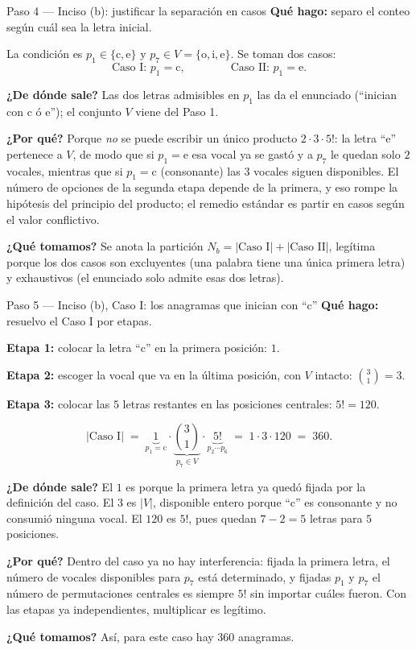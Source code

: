 \documentclass[11pt]{article}
\begin{document}
\begin{paso}{Paso 4 --- Inciso (b): justificar la separación en casos}
\textbf{Qué hago:} separo el conteo según cuál sea la letra inicial.

La condición es $p_1\in\{\text{c},\text{e}\}$ y $p_7\in V=\{\text{o},\text{i},\text{e}\}$. Se toman dos casos:
\[
  \text{Caso I: } p_1=\text{c},\qquad\qquad \text{Caso II: } p_1=\text{e} .
\]

\textbf{¿De dónde sale?} Las dos letras admisibles en $p_1$ las da el enunciado (``inician con c ó e''); el conjunto $V$ viene del Paso 1.

\textbf{¿Por qué?} Porque \emph{no} se puede escribir un único producto $2\cdot 3\cdot 5!$: la letra ``e'' pertenece a $V$, de modo que si $p_1=\text{e}$ esa vocal ya se gastó y a $p_7$ le quedan solo $2$ vocales, mientras que si $p_1=\text{c}$ (consonante) las $3$ vocales siguen disponibles. El número de opciones de la segunda etapa depende de la primera, y eso rompe la hipótesis del principio del producto; el remedio estándar es partir en casos según el valor conflictivo.

\textbf{¿Qué tomamos?} Se anota la partición $N_b=|\text{Caso I}|+|\text{Caso II}|$, legítima porque los dos casos son excluyentes (una palabra tiene una única primera letra) y exhaustivos (el enunciado solo admite esas dos letras).
\end{paso}

\begin{paso}{Paso 5 --- Inciso (b), Caso I: los anagramas que inician con ``c''}
\textbf{Qué hago:} resuelvo el Caso I por etapas.

\medskip
\textbf{Etapa 1:} colocar la letra ``c'' en la primera posición: $1$.

\textbf{Etapa 2:} escoger la vocal que va en la última posición, con $V$ intacto: $\displaystyle\binom{3}{1}=3$.

\textbf{Etapa 3:} colocar las $5$ letras restantes en las posiciones centrales: $5!=120$.

\medskip
\[
  |\text{Caso I}| \;=\; \underbrace{1}_{p_1=\text{c}} \cdot \underbrace{\binom{3}{1}}_{p_7\in V} \cdot \underbrace{5!}_{p_2\cdots p_6} \;=\; 1\cdot 3\cdot 120 \;=\; 360 .
\]

\textbf{¿De dónde sale?} El $1$ es porque la primera letra ya quedó fijada por la definición del caso. El $3$ es $|V|$, disponible entero porque ``c'' es consonante y no consumió ninguna vocal. El $120$ es $5!$, pues quedan $7-2=5$ letras para $5$ posiciones.

\textbf{¿Por qué?} Dentro del caso ya no hay interferencia: fijada la primera letra, el número de vocales disponibles para $p_7$ está determinado, y fijadas $p_1$ y $p_7$ el número de permutaciones centrales es siempre $5!$ sin importar cuáles fueron. Con las etapas ya independientes, multiplicar es legítimo.

\textbf{¿Qué tomamos?} Así, para este caso hay $360$ anagramas.
\end{paso}
\end{document}
